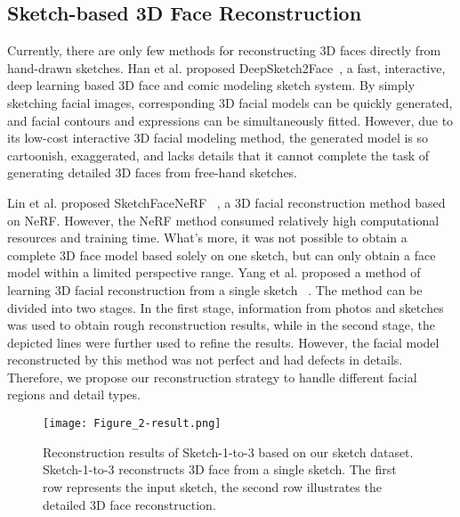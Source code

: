 \subsection{Sketch-based 3D Face Reconstruction} 
Currently, there are only few methods for reconstructing 3D faces directly from hand-drawn sketches. 
Han et al. proposed DeepSketch2Face~\cite{han2017deepsketch2face}, a fast, interactive, deep learning based 3D face and comic modeling sketch system. By simply sketching facial images, corresponding 3D facial models can be quickly generated, and facial contours and expressions can be simultaneously fitted. However, due to its low-cost interactive 3D facial modeling method, the generated model is so cartoonish, exaggerated, and lacks details that it cannot complete the task of generating detailed 3D faces from free-hand sketches.

Lin et al. proposed SketchFaceNeRF ~\cite{lin2023sketchfacenerf}, a 3D facial reconstruction method based on NeRF. However, the NeRF method consumed relatively high computational resources and training time. What’s more, it was not possible to obtain a complete 3D face model based solely on one sketch, but can only obtain a face model within a limited perspective range. Yang et al. proposed a method of learning 3D facial reconstruction from a single sketch ~\cite{Alpher22}. The method can be divided into two stages. In the first stage, information from photos and sketches was used to obtain rough reconstruction results, while in the second stage, the depicted lines were further used to refine the results. However, the facial model reconstructed by this method was not perfect and had defects in details. Therefore, we propose our reconstruction strategy to handle different facial regions and detail types.




\begin{figure*}[t]
    \centering
    \texttt{[image: Figure\_2-result.png]}
    \caption{Reconstruction results of Sketch-1-to-3 based on our sketch dataset. Sketch-1-to-3 reconstructs 3D face from a single sketch. The first row represents the input sketch, the second row illustrates the detailed 3D face reconstruction.}
   \label{fig:first}
\end{figure*}
